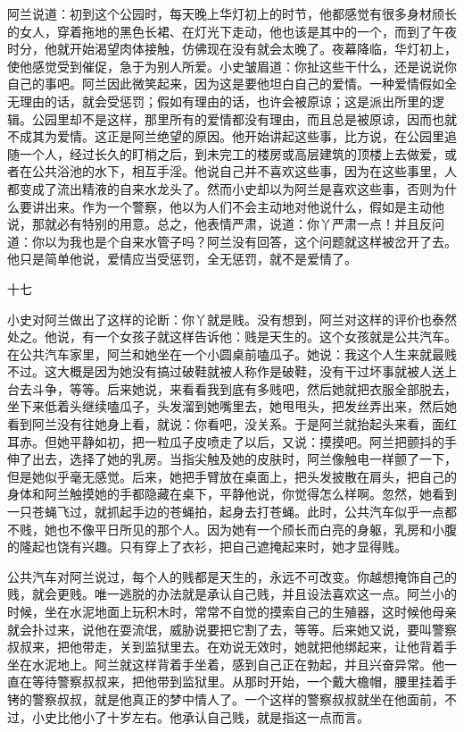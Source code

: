 阿兰说道：初到这个公园时，每天晚上华灯初上的时节，他都感觉有很多身材颀长的女人，穿着拖地的黑色长裙、在灯光下走动，他也该是其中的一个，而到了午夜时分，他就开始渴望肉体接触，仿佛现在没有就会太晚了。夜幕降临，华灯初上，使他感觉受到催促，急于为别人所爱。小史皱眉道：你扯这些干什么，还是说说你自己的事吧。阿兰因此微笑起来，因为这是要他坦白自己的爱情。一种爱情假如全无理由的话，就会受惩罚；假如有理由的话，也许会被原谅；这是派出所里的逻辑。公园里却不是这样，那里所有的爱情都没有理由，而且总是被原谅，因而也就不成其为爱情。这正是阿兰绝望的原因。他开始讲起这些事，比方说，在公园里追随一个人，经过长久的盯梢之后，到未完工的楼房或高层建筑的顶楼上去做爱，或者在公共浴池的水下，相互手淫。他说自己并不喜欢这些事，因为在这些事里，人都变成了流出精液的自来水龙头了。然而小史却以为阿兰是喜欢这些事，否则为什么要讲出来。作为一个警察，他以为人们不会主动地对他说什么，假如是主动他说，那就必有特别的用意。总之，他表情严肃，说道：你丫严肃一点！并且反问道：你以为我也是个自来水管子吗？阿兰没有回答，这个问题就这样被岔开了去。他只是简单他说，爱情应当受惩罚，全无惩罚，就不是爱情了。 

十七 

小史对阿兰做出了这样的论断：你丫就是贱。没有想到，阿兰对这样的评价也泰然处之。他说，有一个女孩子就这样告诉他：贱是天生的。这个女孩就是公共汽车。在公共汽车家里，阿兰和她坐在一个小圆桌前嗑瓜子。她说：我这个人生来就最贱不过。这大概是因为她没有搞过破鞋就被人称作是破鞋，没有干过坏事就被人送上台去斗争，等等。后来她说，来看看我到底有多贱吧，然后她就把衣服全部脱去，坐下来低着头继续嗑瓜子，头发溜到她嘴里去，她甩甩头，把发丝弄出来，然后她看到阿兰没有往她身上看，就说：你看吧，没关系。于是阿兰就抬起头来看，面红耳赤。但她平静如初，把一粒瓜子皮喷走了以后，又说：摸摸吧。阿兰把颤抖的手伸了出去，选择了她的乳房。当指尖触及她的皮肤时，阿兰像触电一样颤了一下，但是她似乎毫无感觉。后来，她把手臂放在桌面上，把头发披散在肩头，把自己的身体和阿兰触摸她的手都隐藏在桌下，平静他说，你觉得怎么样啊。忽然，她看到一只苍蝇飞过，就抓起手边的苍蝇拍，起身去打苍蝇。此时，公共汽车似乎一点都不贱，她也不像平日所见的那个人。因为她有一个颀长而白亮的身躯，乳房和小腹的隆起也饶有兴趣。只有穿上了衣衫，把自己遮掩起来时，她才显得贱。 

公共汽车对阿兰说过，每个人的贱都是天生的，永远不可改变。你越想掩饰自己的贱，就会更贱。唯一逃脱的办法就是承认自己贱，并且设法喜欢这一点。阿兰小的时候，坐在水泥地面上玩积木时，常常不自觉的摸索自己的生殖器，这时候他母亲就会扑过来，说他在耍流氓，威胁说要把它割了去，等等。后来她又说，要叫警察叔叔来，把他带走，关到监狱里去。在劝说无效时，她就把他绑起来，让他背着手坐在水泥地上。阿兰就这样背着手坐着，感到自己正在勃起，并且兴奋异常。他一直在等待警察叔叔来，把他带到监狱里。从那时开始，一个戴大檐帽，腰里挂着手铐的警察叔叔，就是他真正的梦中情人了。一个这样的警察叔叔就坐在他面前，不过，小史比他小了十岁左右。他承认自己贱，就是指这一点而言。 

